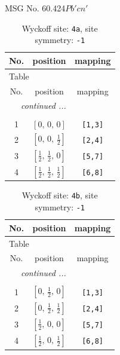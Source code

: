 \documentclass[fleqn,8pt]{jsarticle}
\begin{document}
\setcounter{MaxMatrixCols}{32}

\renewcommand{\tablename}{Table~}
\renewcommand{\figurename}{Figure~}
\begin{center}
\LARGE
MSG No. 60.424\quad$Pb'cn'$
\end{center}
\renewcommand{\arraystretch}{1.2}
\begin{longtable}{ccc}
\caption{Wyckoff site: {\tt 4a}, site symmetry: {\tt -1}}
 \\
 \hline \hline
No. & position & mapping \\ \hline \endfirsthead

\multicolumn{2}{l}{\tablename\ \thetable{}} \\
 \hline \hline
No. & position & mapping \\ \hline \endhead

 \hline \hline
\multicolumn{2}{r}{\footnotesize\it continued ...} \\ \endfoot

 \hline \hline
\multicolumn{2}{r}{} \\ \endlastfoot

1 & $\left[ 0,\, 0,\, 0 \right]$ & {\tt [1,3]} \\ \hline
2 & $\left[ 0,\, 0,\, \frac{1}{2} \right]$ & {\tt [2,4]} \\ \hline
3 & $\left[ \frac{1}{2},\, \frac{1}{2},\, 0 \right]$ & {\tt [5,7]} \\ \hline
4 & $\left[ \frac{1}{2},\, \frac{1}{2},\, \frac{1}{2} \right]$ & {\tt [6,8]} \\
\end{longtable}
\renewcommand{\arraystretch}{1.2}
\begin{longtable}{ccc}
\caption{Wyckoff site: {\tt 4b}, site symmetry: {\tt -1}}
 \\
 \hline \hline
No. & position & mapping \\ \hline \endfirsthead

\multicolumn{2}{l}{\tablename\ \thetable{}} \\
 \hline \hline
No. & position & mapping \\ \hline \endhead

 \hline \hline
\multicolumn{2}{r}{\footnotesize\it continued ...} \\ \endfoot

 \hline \hline
\multicolumn{2}{r}{} \\ \endlastfoot

1 & $\left[ 0,\, \frac{1}{2},\, 0 \right]$ & {\tt [1,3]} \\ \hline
2 & $\left[ 0,\, \frac{1}{2},\, \frac{1}{2} \right]$ & {\tt [2,4]} \\ \hline
3 & $\left[ \frac{1}{2},\, 0,\, 0 \right]$ & {\tt [5,7]} \\ \hline
4 & $\left[ \frac{1}{2},\, 0,\, \frac{1}{2} \right]$ & {\tt [6,8]} \\
\end{longtable}
\end{document}
